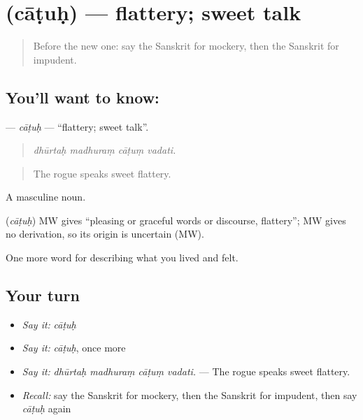 \section[\texorpdfstring{\sk{चाटुः} (cāṭuḥ)}{चाटुः (cāṭuḥ)}]{ (cāṭuḥ) — flattery; sweet talk}

\label{lesson:SA-C467-catuh}



\begin{quote}
Before the new one: say the Sanskrit for mockery, then the Sanskrit for impudent.
\end{quote}

\subsection*{You'll want to know: }
\textbf{} — \emph{cāṭuḥ} — \textquotedblleft{}flattery; sweet talk\textquotedblright{}.

\begin{quote}
   
\end{quote}

\begin{quote}
\emph{dhūrtaḥ madhuraṃ cāṭuṃ vadati.}
\end{quote}

\begin{quote}
The rogue speaks sweet flattery.
\end{quote}

A masculine noun.

\begin{cousinweb}
\textbf{} (\emph{cāṭuḥ}) MW gives \textquotedblleft{}pleasing or graceful words or discourse, flattery\textquotedblright{}; MW gives no derivation, so its origin is uncertain (MW).
\end{cousinweb}

\begin{grammarlens}[title={What you've built}]
One more word for describing what you lived and felt.
\end{grammarlens}

\subsection*{Your turn}
\begin{itemize}
\raggedright
  \item \emph{Say it:} \emph{cāṭuḥ}
  \item \emph{Say it:} \emph{cāṭuḥ}, once more
  \item \emph{Say it:} \emph{dhūrtaḥ madhuraṃ cāṭuṃ vadati.} — The rogue speaks sweet flattery.
  \item \emph{Recall:} say the Sanskrit for mockery, then the Sanskrit for impudent, then say \emph{cāṭuḥ} again
\end{itemize}

